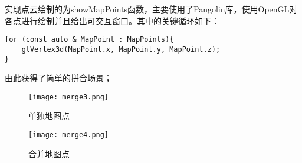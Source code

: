 实现点云绘制的为showMapPoints函数，主要使用了Pangolin库，使用OpenGL对各点进行绘制并且给出可交互窗口。其中的关键循环如下：

\begin{verbatim}
for (const auto & MapPoint : MapPoints){
    glVertex3d(MapPoint.x, MapPoint.y, MapPoint.z);
}
\end{verbatim}

由此获得了简单的拼合场景；

\begin{figure}[htbp]
	\centering
	\begin{minipage}[t]{0.45\columnwidth} %
		\centering
		\texttt{[image: merge3.png]}
		\caption{单独地图点}
		\label{merge1}
	\end{minipage}
	\begin{minipage}[t]{0.45\columnwidth}
		\centering
		\texttt{[image: merge4.png]}
		\caption{合并地图点}
		\label{merge2}
	\end{minipage}
\end{figure}









